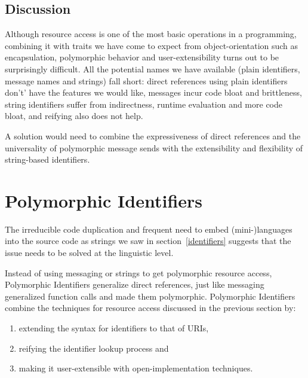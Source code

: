 \documentclass[preprint,authoryear]{llncs}
\begin{document}
\subsection{Discussion}

Although resource access is one of the most basic operations in a programming, combining it
with traits we have come to expect from object-orientation such as encapsulation, polymorphic
behavior and user-extensibility turns out to be surprisingly difficult.   All the potential names
we have available (plain identifiers, message names and strings) fall short:  direct references
using plain identifiers don't' have the features we would like, messages incur code bloat
and brittleness, string identifiers suffer from indirectness, runtime evaluation and more
code bloat, and reifying also does not help.

A solution would need to combine the expressiveness of direct references and the universality
of polymorphic message sends with the extensibility and flexibility of string-based identifiers.



\section{Polymorphic Identifiers}
\label{polymorphic-identifiers}

The irreducible code duplication and frequent need to embed (mini-)languages into the
source code as strings we saw in section~\ref{identifiers} suggests that the issue needs to be
solved at the linguistic level.

Instead of using messaging or strings to get polymorphic resource access, Polymorphic Identifiers
generalize direct references,  just like messaging generalized function calls and made them polymorphic.
Polymorphic Identifiers combine the techniques for resource access discussed in the previous 
section by:
\begin{enumerate}
\item extending the syntax for identifiers to that of URIs,
\item reifying the identifier lookup process and
\item making it user-extensible with open-implementation techniques.
\end{enumerate}
\end{document}
